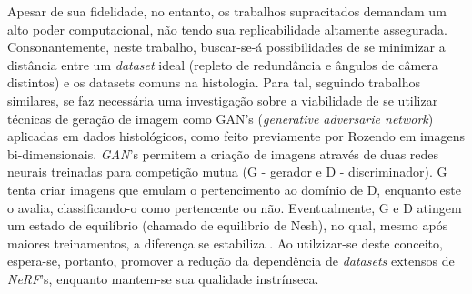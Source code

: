 Apesar de sua fidelidade, no entanto, os trabalhos supracitados demandam um alto poder computacional, não tendo sua replicabilidade altamente assegurada. Consonantemente, neste trabalho, buscar-se-á possibilidades de se minimizar a distância entre um \textit{dataset} ideal (repleto de redundância e ângulos de câmera distintos) e os datasets comuns na histologia. Para tal, seguindo trabalhos similares, se faz necessária uma investigação sobre a viabilidade de se utilizar técnicas de geração de imagem como GAN's (\textit{generative adversarie network}) aplicadas em dados histológicos, como feito previamente por Rozendo \cite{rozendo2024histdataaug} em imagens bi-dimensionais.   \textit{GAN}'s  permitem a criação de imagens através de duas redes neurais treinadas para competição mutua (G - gerador e  D - discriminador). G tenta criar imagens que emulam o pertencimento ao domínio de D, enquanto este o avalia, classificando-o como pertencente ou não. Eventualmente, G e D atingem um estado de equilíbrio (chamado de equilibrio de Nesh), no qual, mesmo após maiores treinamentos, a diferença se estabiliza \cite{goodfellow2014generativeadversarialnetworks} . Ao utilzizar-se deste conceito, espera-se, portanto, promover a redução da dependência de \textit{datasets} extensos de \textit{NeRF}'s, enquanto mantem-se sua qualidade instrínseca.
